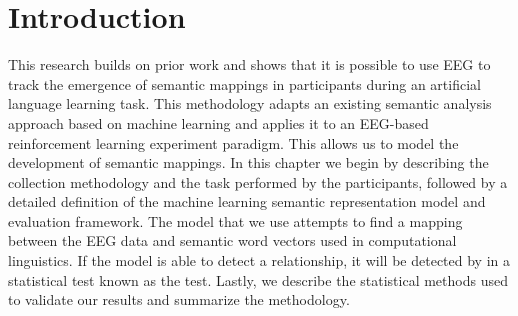 \section{Introduction}

This research builds on prior work and shows that it is possible to use EEG to track the emergence of semantic mappings in participants during an artificial language learning task. This methodology adapts an existing semantic analysis approach based on machine learning and applies it to an EEG-based reinforcement learning experiment paradigm. This allows us to model the development of semantic mappings. In this chapter we begin by describing the collection methodology and the task performed by the participants, followed by a detailed definition of the machine learning semantic representation model and evaluation framework. The model that we use attempts to find a mapping between the EEG data and semantic word vectors used in computational linguistics. If the model is able to detect a relationship, it will be detected by in a statistical test known as the \tvt test. Lastly, we describe the statistical methods used to validate our results and summarize the methodology.
